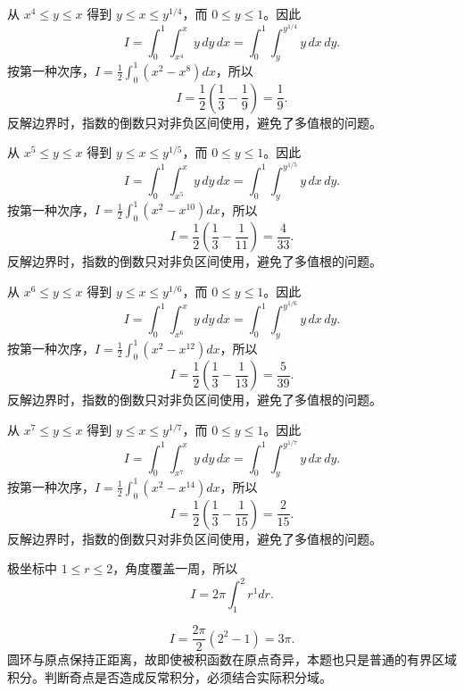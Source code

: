 \documentclass[UTF8,12pt,a4paper,fontset=fandol]{ctexart}
\begin{document}
\begin{solve}\label{ans:c37q9}
从 $x^{4}\le y\le x$ 得到 $y\le x\le y^{1/4}$，而 $0\le y\le1$。因此
\[
I=\int_0^1\int_{x^{4}}^x y\,dy\,dx=\int_0^1\int_y^{y^{1/4}}y\,dx\,dy.
\]
按第一种次序，$I=\frac12\int_0^1(x^2-x^{8})dx$，所以
\[
I=\frac12\left(\frac13-\frac1{9}\right)=\frac{1}{9}.
\]
反解边界时，指数的倒数只对非负区间使用，避免了多值根的问题。
\end{solve}

\begin{solve}\label{ans:c37q10}
从 $x^{5}\le y\le x$ 得到 $y\le x\le y^{1/5}$，而 $0\le y\le1$。因此
\[
I=\int_0^1\int_{x^{5}}^x y\,dy\,dx=\int_0^1\int_y^{y^{1/5}}y\,dx\,dy.
\]
按第一种次序，$I=\frac12\int_0^1(x^2-x^{10})dx$，所以
\[
I=\frac12\left(\frac13-\frac1{11}\right)=\frac{4}{33}.
\]
反解边界时，指数的倒数只对非负区间使用，避免了多值根的问题。
\end{solve}

\begin{solve}\label{ans:c37q11}
从 $x^{6}\le y\le x$ 得到 $y\le x\le y^{1/6}$，而 $0\le y\le1$。因此
\[
I=\int_0^1\int_{x^{6}}^x y\,dy\,dx=\int_0^1\int_y^{y^{1/6}}y\,dx\,dy.
\]
按第一种次序，$I=\frac12\int_0^1(x^2-x^{12})dx$，所以
\[
I=\frac12\left(\frac13-\frac1{13}\right)=\frac{5}{39}.
\]
反解边界时，指数的倒数只对非负区间使用，避免了多值根的问题。
\end{solve}

\begin{solve}\label{ans:c37q12}
从 $x^{7}\le y\le x$ 得到 $y\le x\le y^{1/7}$，而 $0\le y\le1$。因此
\[
I=\int_0^1\int_{x^{7}}^x y\,dy\,dx=\int_0^1\int_y^{y^{1/7}}y\,dx\,dy.
\]
按第一种次序，$I=\frac12\int_0^1(x^2-x^{14})dx$，所以
\[
I=\frac12\left(\frac13-\frac1{15}\right)=\frac{2}{15}.
\]
反解边界时，指数的倒数只对非负区间使用，避免了多值根的问题。
\end{solve}

\begin{solve}\label{ans:c37q13}
极坐标中 $1\le r\le2$，角度覆盖一周，所以
\[
I=2\pi\int_1^2r^{1}dr.
\]

\[
I=\frac{2\pi}{2}(2^{2}-1)=3\pi.
\]
圆环与原点保持正距离，故即使被积函数在原点奇异，本题也只是普通的有界区域积分。判断奇点是否造成反常积分，必须结合实际积分域。
\end{solve}
\end{document}
